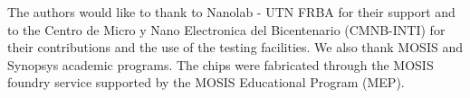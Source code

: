 The authors would like to thank to Nanolab - UTN FRBA for their support and to the Centro de Micro y Nano Electronica del Bicentenario (CMNB-INTI) \cite{cmnb} for their contributions and the use of the testing facilities. 
We also thank MOSIS and Synopsys \cite{synopsys} academic programs. The chips were fabricated through the MOSIS foundry service supported by the MOSIS Educational Program (MEP).